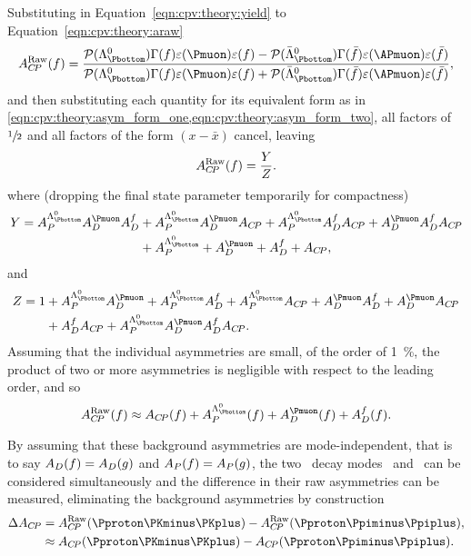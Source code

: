 Substituting in Equation~\ref{eqn:cpv:theory:yield} to 
Equation~\ref{eqn:cpv:theory:araw}
\begin{equation*}
  \ARaw(f) = \frac{%
    \prob(\PLambdab)\Gamma(f)\eff(\Pmuon)\eff(f) - 
    \prob(\APLambdab)\Gamma(\bar{f})\eff(\APmuon)\eff(\bar{f})
  }{%
    \prob(\PLambdab)\Gamma(f)\eff(\Pmuon)\eff(f) + 
    \prob(\APLambdab)\Gamma(\bar{f})\eff(\APmuon)\eff(\bar{f})
  },
\end{equation*}
and then substituting each quantity for its equivalent form as in 
\cref{eqn:cpv:theory:asym_form_one,eqn:cpv:theory:asym_form_two}, all factors 
of $\sfrac{1}{2}$ and all factors of the form $(x - \bar{x})$ cancel, leaving
\begin{equation}
A_{C\!P}^{\textnormal{Raw}}(f) = \frac{Y}{Z}.
\end{equation}
where (dropping the final state parameter temporarily for compactness)
\begin{align}
Y = \APLb\ADmu\ADf &+ \APLb\ADmu\ACP + \APLb\ADf\ACP + \ADmu\ADf\ACP \nonumber\\
                   &+ \APLb +  \ADmu + \ADf + \ACP,
\end{align}
and
\begin{align}
Z = 1 &+ \APLb\ADmu + \APLb\ADf + \APLb\ACP + \ADmu\ADf + \ADmu\ACP \nonumber\\
      &+ \ADf\ACP + \APLb\ADmu\ADf\ACP.
\end{align}
Assuming that the individual asymmetries are small, of the order of 
\SI{1}{\percent}, the product of two or more asymmetries is negligible with 
respect to the leading order, and so
\begin{equation}
  \ARaw(f) \approx \ACP(f) + \APLb(f) + \ADmu(f) + \ADf(f).
  \label{eqn:cpv:theory:araw_approx}
\end{equation}

By assuming that these background asymmetries are mode-independent, that is to 
say $A_{D}(f) = A_{D}(g)$ and $A_{P}(f) = A_{P}(g)$, the two \PLambdac\ decay modes 
\pKK\ and \ppipi\ can be considered simultaneously and the difference in their 
raw asymmetries can be measured, eliminating the background asymmetries by 
construction
\begin{align}
  \dACP &= \ARaw(\pKK) - \ARaw(\ppipi),\label{eqn:cpv:theory:dacp}\\
        &\approx \ACP(\pKK) - \ACP(\ppipi)\nonumber.
\end{align}

